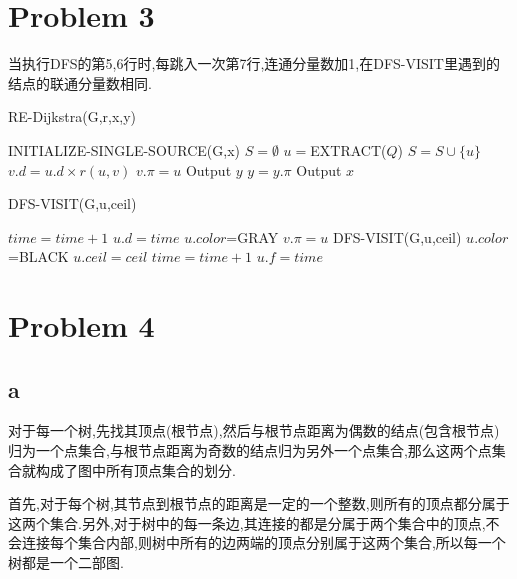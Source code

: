 \documentclass[12pt,a4paper,fontset=none]{ctexart}
\begin{document}
\section{Problem 3}
当执行DFS的第5,6行时,每跳入一次第7行,连通分量数加1,在DFS-VISIT里遇到的结点的联通分量数相同.
\begin{algorithm}
    \renewcommand{\algorithmicensure}{\textbf{Output:}}
    \renewcommand{\algorithmicrequire}{\textbf{Input:}}
    \caption{RE-Dijkstra(G,r,x,y) }
    \label{alg1}
    \begin{algorithmic}
        \State INITIALIZE-SINGLE-SOURCE(G,x)
        \State $S=\emptyset$
        \State $u=$EXTRACT($Q$)
        \State $S=S\cup \{u\}$
        \State $v.d=u.d\times r(u,v)$
        \State $v.\pi =u$
        \EndIf
        \EndFor
        \EndWhile
        \State Output $y$
        \State $y=y.\pi$
        \EndWhile
        \State Output $x$
    \end{algorithmic}
\end{algorithm}
\begin{algorithm}
    \renewcommand{\algorithmicensure}{\textbf{Output:}}
    \renewcommand{\algorithmicrequire}{\textbf{Input:}}
    \caption{DFS-VISIT(G,u,ceil) }
    \label{alg2}
    \begin{algorithmic}
        \State $time=time+1$
        \State $u.d=time$
        \State $u.color$=GRAY
        \State $v.\pi=u$
        \State DFS-VISIT(G,u,ceil)
        \EndIf
        \EndFor
        \State $u.color$=BLACK
        \State $u.ceil=ceil$
        \State $time=time+1$
        \State $u.f=time$
    \end{algorithmic}
\end{algorithm}
\section{Problem 4}
\subsection{a}
对于每一个树,先找其顶点(根节点),然后与根节点距离为偶数的结点(包含根节点)归为一个点集合,与根节点距离为奇数的结点归为另外一个点集合,那么这两个点集合就构成了图中所有顶点集合的划分.

首先,对于每个树,其节点到根节点的距离是一定的一个整数,则所有的顶点都分属于这两个集合.另外,对于树中的每一条边,其连接的都是分属于两个集合中的顶点,不会连接每个集合内部,则树中所有的边两端的顶点分别属于这两个集合,所以每一个树都是一个二部图.
\end{document}
